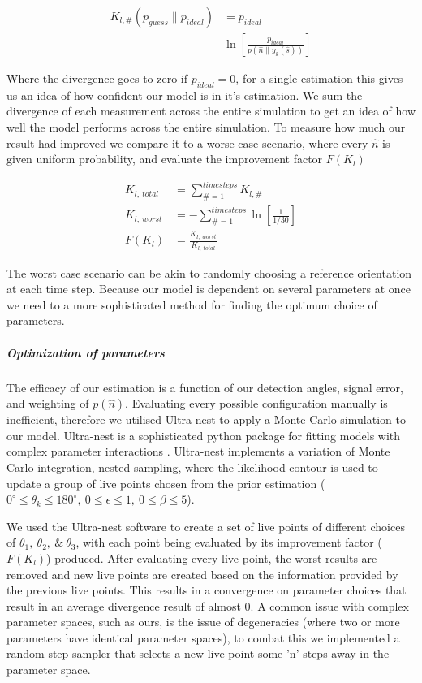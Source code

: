 \documentclass[preprint,3p]{elsarticle}
\begin{document}
\begin{align}
	K_{l, \#}(p_{guess} \parallel p_{ideal}) &= 
	p_{ideal} \nonumber \\ 
	&\ln \left[\frac{p_{ideal}}{p(\hat{n}\parallel y_k(\hat{s}))}
	\right]
\end{align}

Where the divergence goes to zero if $p_{ideal}=0$, for a single estimation this gives us an idea of how confident our model is in it's estimation. We sum the divergence of each measurement across the entire simulation to get an idea of how well the model performs across the entire simulation. To measure how much our result had improved we compare it to a worse case scenario, where every $\hat{n}$ is given uniform probability, and evaluate the improvement factor $F(K_l)$

\begin{align}
	K_{l, \ total} &= \sum\limits_{\# =1}^{timesteps} K_{l,\#} \\
	K_{l, \ worst} &= -\sum\limits_{\#=1}^{timesteps} \ln \left[\frac{1}{1/30} \right] \\
	F(K_l) &= \frac{K_{l,\ worst}}{K_{l, \ total}}
\end{align}

The worst case scenario can be akin to randomly choosing a reference orientation at each time step. Because our model is dependent on several parameters at once we need to a more sophisticated method for finding the optimum choice of parameters.  

\subparagraph{Optimization of parameters}
\label{2.3}
The efficacy of our estimation is a function of our detection angles, signal error, and weighting of $p(\hat{n})$. Evaluating every possible configuration manually is inefficient, therefore we utilised Ultra nest to apply a Monte Carlo simulation to our model. Ultra-nest is a sophisticated python package for fitting models with complex parameter interactions \cite{Buchner2016Ultranest}. Ultra-nest implements a variation of Monte Carlo integration, nested-sampling, where the likelihood contour is used to update a group of live points chosen from the prior estimation ($0^{\circ} \leq \theta_k \leq 180^{\circ}, \ 0 \leq \epsilon \leq 1, \ 0 \leq \beta \leq 5$).

We used the Ultra-nest software to create a set of live points of different choices of $\theta_1, \ \theta_2, \ \& \ \theta_3$, with each point being evaluated by its improvement factor ($F(K_l)$) produced. After evaluating every live point, the worst results are removed and new live points are created based on the information provided by the previous live points. This results in a convergence on parameter choices that result in an average divergence result of almost 0. A common issue with complex parameter spaces, such as ours, is the issue of degeneracies (where two or more parameters have identical parameter spaces), to combat this we implemented a random step sampler that selects a new live point some 'n' steps away in the parameter space.
 
\end{document}

